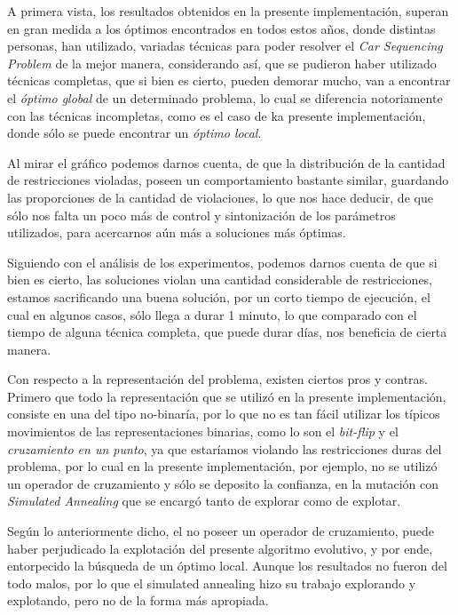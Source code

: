 
A primera vista, los resultados obtenidos en la presente implementación, superan en gran medida a los óptimos encontrados
en todos estos años, donde distintas personas, han utilizado, variadas técnicas para poder resolver el \emph{Car Sequencing Problem}
de la mejor manera, considerando así, que se pudieron haber utilizado técnicas completas, que si bien es cierto, pueden demorar mucho,
van a encontrar el \emph{óptimo global} de un determinado problema, lo cual se diferencia notoriamente con las técnicas incompletas,
como es el caso de ka presente implementación, donde sólo se puede encontrar un \emph{óptimo local}.

Al mirar el gráfico podemos darnos cuenta, de que la distribución de la cantidad de restricciones violadas, poseen un comportamiento
bastante similar, guardando las proporciones de la cantidad de violaciones, lo que nos hace deducir, de que sólo nos falta un poco
más de control y sintonización de los parámetros utilizados, para acercarnos aún más a soluciones más óptimas.

Siguiendo con el análisis de los experimentos, podemos darnos cuenta de que si bien es cierto, las soluciones violan una cantidad
considerable de restricciones, estamos sacrificando una buena solución, por un corto tiempo de ejecución, el cual en algunos casos,
sólo llega a durar 1 minuto, lo que comparado con el tiempo de alguna técnica completa, que puede durar días, nos beneficia de cierta manera.

Con respecto a la representación del problema, existen ciertos pros y contras.
Primero que todo la representación que se utilizó en la presente implementación,
consiste en una del tipo no-binaría, por lo que no es tan fácil utilizar los típicos movimientos de las representaciones binarias,
como lo son el \emph{bit-flip} y el \emph{cruzamiento en un punto}, ya que estaríamos violando las restricciones duras del problema,
por lo cual en la presente implementación, por ejemplo, no se utilizó un operador de cruzamiento y sólo se deposito la confianza,
en la mutación con \emph{Simulated Annealing} que se encargó tanto de explorar como de explotar.

Según lo anteriormente dicho, el no poseer un operador de cruzamiento, puede haber perjudicado la explotación del presente algoritmo
evolutivo, y por ende, entorpecido la búsqueda de un óptimo local. Aunque los resultados no fueron del todo malos, por lo que el simulated annealing
hizo su trabajo explorando y explotando, pero no de la forma más apropiada.

